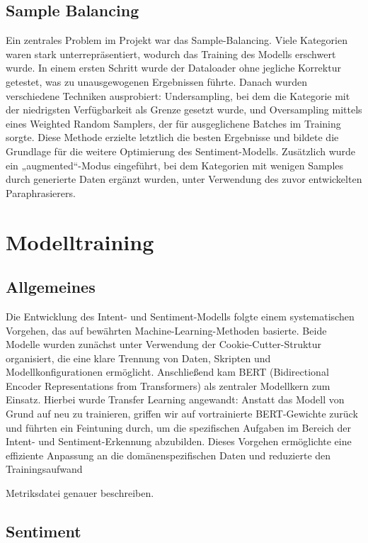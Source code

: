 \subsection{Sample Balancing}

Ein zentrales Problem im Projekt war das Sample-Balancing. Viele Kategorien waren stark
unterrepräsentiert, wodurch das Training des Modells erschwert wurde. In einem ersten Schritt wurde
der Dataloader ohne jegliche Korrektur getestet, was zu unausgewogenen Ergebnissen führte. Danach
wurden verschiedene Techniken ausprobiert: Undersampling, bei dem die Kategorie mit der niedrigsten
Verfügbarkeit als Grenze gesetzt wurde, und Oversampling mittels eines Weighted Random Samplers, der
für ausgeglichene Batches im Training sorgte. Diese Methode erzielte letztlich die besten Ergebnisse
und bildete die Grundlage für die weitere Optimierung des Sentiment-Modells. Zusätzlich wurde ein
„augmented“-Modus eingeführt, bei dem Kategorien mit wenigen Samples durch generierte Daten ergänzt
wurden, unter Verwendung des zuvor entwickelten Paraphrasierers.


\section{Modelltraining}

\subsection{Allgemeines}

Die Entwicklung des Intent- und Sentiment-Modells folgte einem systematischen Vorgehen,
das auf bewährten Machine-Learning-Methoden basierte. Beide Modelle wurden zunächst unter
Verwendung der Cookie-Cutter-Struktur organisiert, die eine klare Trennung von Daten, Skripten
und Modellkonfigurationen ermöglicht. Anschließend kam BERT (Bidirectional Encoder
Representations from Transformers) als zentraler Modellkern zum Einsatz. Hierbei wurde Transfer
Learning angewandt: Anstatt das Modell von Grund auf neu zu trainieren, griffen wir auf
vortrainierte BERT-Gewichte zurück und führten ein Feintuning durch, um die spezifischen
Aufgaben im Bereich der Intent- und Sentiment-Erkennung abzubilden. Dieses Vorgehen ermöglichte
eine effiziente Anpassung an die domänenspezifischen Daten und reduzierte den Trainingsaufwand 
 
Metriksdatei genauer beschreiben. 

\subsection{Sentiment}
